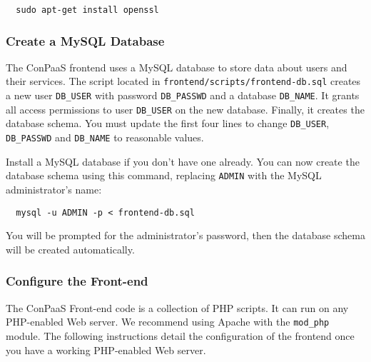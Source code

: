 \documentclass[10pt]{article}
\begin{document}
\begin{verbatim}
  sudo apt-get install openssl
\end{verbatim}

\subsubsection{Create a MySQL Database}

The ConPaaS frontend uses a MySQL database to store data about users
and their services. The script located in
\verb+frontend/scripts/frontend-db.sql+ creates a new user
\verb+DB_USER+ with password \verb+DB_PASSWD+ and a database
\verb+DB_NAME+. It grants all access permissions to user
\verb+DB_USER+ on the new database. Finally, it creates the database
schema. You must update the first four lines to change \verb+DB_USER+,
\verb+DB_PASSWD+ and \verb+DB_NAME+ to reasonable values.

Install a MySQL database if you don't have one already. You can now
create the database schema using this command, replacing \verb+ADMIN+
with the MySQL administrator's name:

\begin{verbatim}
  mysql -u ADMIN -p < frontend-db.sql
\end{verbatim}

You will be prompted for the administrator's password, then the
database schema will be created automatically.

\subsubsection{Configure the Front-end}

The ConPaaS Front-end code is a collection of PHP scripts. It can run
on any PHP-enabled Web server. We recommend using Apache with the
\verb+mod_php+ module. The following instructions detail the
configuration of the frontend once you have a working PHP-enabled Web
server.
\end{document}
